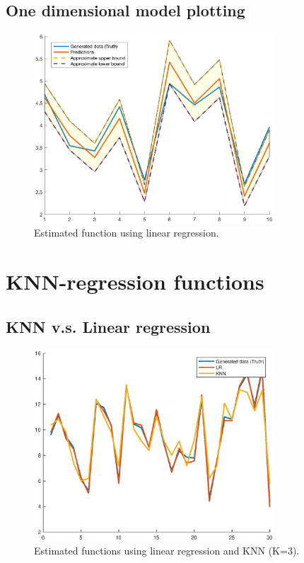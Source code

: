 \documentclass[]{article}
\begin{document}
\subsection{One dimensional model plotting}
\begin{figure}[H]
	\caption{Estimated function using linear regression.}
	\centering
	\includegraphics[width=0.8\textwidth]{project1e.eps}
\end{figure}

\section{KNN-regression functions}

\subsection{KNN v.s. Linear regression}
\begin{figure}[H]
	\caption{Estimated functions using linear regression and KNN (K=3).}
	\centering
	\includegraphics[width=0.8\textwidth]{project2b}
\end{figure}
\end{document}
